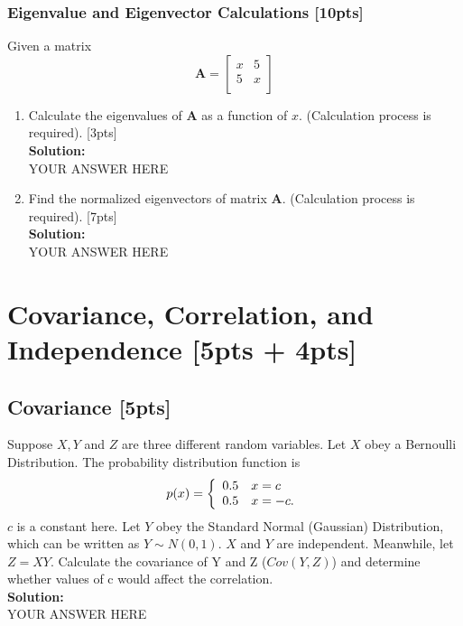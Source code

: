 \documentclass{article}
\begin{document}
\subsubsection{Eigenvalue and Eigenvector Calculations [10pts]}
Given a matrix
$$\boldsymbol{A} = \begin{bmatrix} 
  x & 5  \\ 
  5 & x \\
  \end{bmatrix}$$
\begin{enumerate}[label=(\alph*)]
\item Calculate the eigenvalues of $\boldsymbol{A}$ as a function of $x$. (Calculation process is required). [3pts]\bigskip \\
\textbf{Solution:}\\
YOUR ANSWER HERE
\newpage
\item Find the normalized eigenvectors of matrix $\boldsymbol{A}$. (Calculation process is required). [7pts]\bigskip \\
\textbf{Solution:}\\
YOUR ANSWER HERE
\newpage
\end{enumerate}



\section{Covariance, Correlation, and Independence [5pts + 4pts]}
\subsection{Covariance [5pts]}
Suppose $X, Y$ and $Z$ are three different random variables.
Let $X$ obey a Bernoulli Distribution. The probability distribution function is
    $$p(x)=\left\{
    \begin{array}{c l}	
         0.5 & x = c\\
         0.5 & x = -c.
    \end{array}\right.$$
$c$ is a constant here. Let $Y$ obey the Standard Normal (Gaussian) Distribution, which can be written as $Y \sim N(0,1)$. $X$ and $Y$ are independent. Meanwhile, let $Z = XY$.
\newline
\newline
Calculate the covariance of Y and Z ($Cov(Y, Z)$) and determine whether values of c would affect the correlation.\bigskip \\
\textbf{Solution:}\\
YOUR ANSWER HERE
\newpage
\end{document}
